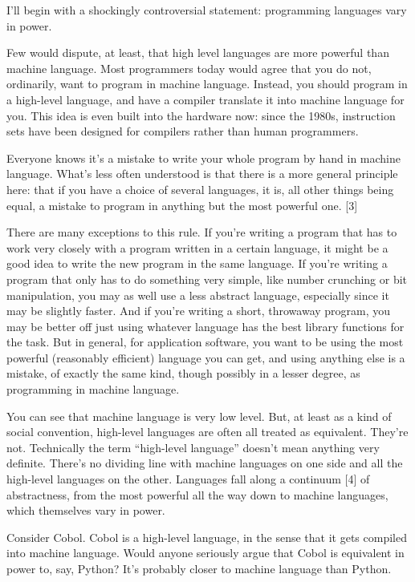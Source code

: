 I'll begin with a shockingly controversial statement: programming
languages vary in power.

Few would dispute, at least, that high level languages are more powerful
than machine language. Most programmers today would agree that you do
not, ordinarily, want to program in machine language. Instead, you
should program in a high-level language, and have a compiler translate
it into machine language for you. This idea is even built into the
hardware now: since the 1980s, instruction sets have been designed for
compilers rather than human programmers.

Everyone knows it's a mistake to write your whole program by hand in
machine language. What's less often understood is that there is a more
general principle here: that if you have a choice of several languages,
it is, all other things being equal, a mistake to program in anything
but the most powerful one. {[}3{]}

There are many exceptions to this rule. If you're writing a program that
has to work very closely with a program written in a certain language,
it might be a good idea to write the new program in the same language.
If you're writing a program that only has to do something very simple,
like number crunching or bit manipulation, you may as well use a less
abstract language, especially since it may be slightly faster. And if
you're writing a short, throwaway program, you may be better off just
using whatever language has the best library functions for the task. But
in general, for application software, you want to be using the most
powerful (reasonably efficient) language you can get, and using anything
else is a mistake, of exactly the same kind, though possibly in a lesser
degree, as programming in machine language.

You can see that machine language is very low level. But, at least as a
kind of social convention, high-level languages are often all treated as
equivalent. They're not. Technically the term ``high-level language''
doesn't mean anything very definite. There's no dividing line with
machine languages on one side and all the high-level languages on the
other. Languages fall along a continuum {[}4{]} of abstractness, from
the most powerful all the way down to machine languages, which
themselves vary in power.

Consider Cobol. Cobol is a high-level language, in the sense that it
gets compiled into machine language. Would anyone seriously argue that
Cobol is equivalent in power to, say, Python? It's probably closer to
machine language than Python.

